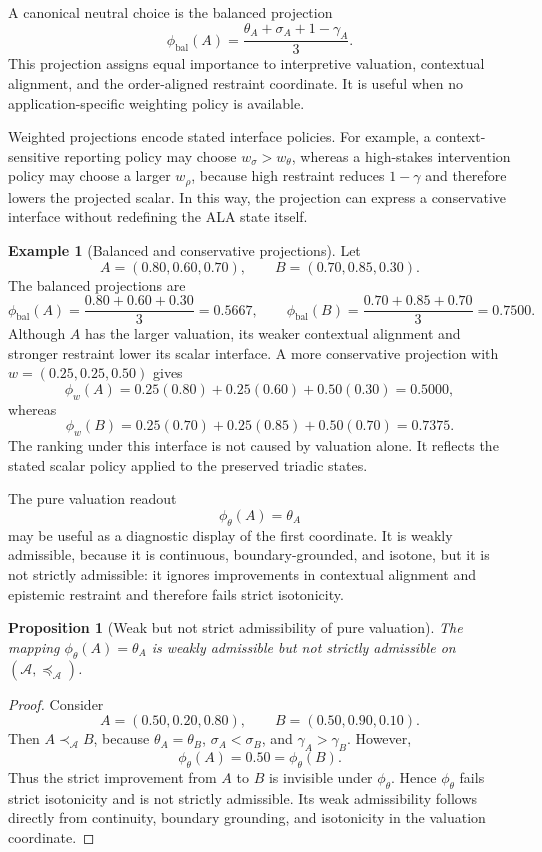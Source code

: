 \documentclass[reqno,final]{amsart}
\theoremstyle{definition}
\newtheorem{example}{Example}
\theoremstyle{plain}
\newtheorem{proposition}{Proposition}
\theoremstyle{remark}
\providecommand{\cA}{\mathcal{A}}
\providecommand{\preceqA}{\preceq_{\mathcal A}}
\providecommand{\precA}{\prec_{\mathcal A}}
\begin{document}
A canonical neutral choice is the balanced projection
\begin{equation}
\phi_{\mathrm{bal}}(A)
=\frac{\theta_A+\sigma_A+1-\gamma_A}{3}.
\label{eq:balanced-projection}
\end{equation}
This projection assigns equal importance to interpretive valuation, contextual alignment, and the order-aligned restraint coordinate. It is useful when no application-specific weighting policy is available.

Weighted projections encode stated interface policies. For example, a context-sensitive reporting policy may choose \(w_\sigma>w_\theta\), whereas a high-stakes intervention policy may choose a larger \(w_\rho\), because high restraint reduces \(1-\gamma\) and therefore lowers the projected scalar. In this way, the projection can express a conservative interface without redefining the ALA state itself.

\begin{example}[Balanced and conservative projections]
Let
\[
A=(0.80,0.60,0.70),
\qquad
B=(0.70,0.85,0.30).
\]
The balanced projections are
\[
\phi_{\mathrm{bal}}(A)=\frac{0.80+0.60+0.30}{3}=0.5667,
\qquad
\phi_{\mathrm{bal}}(B)=\frac{0.70+0.85+0.70}{3}=0.7500.
\]
Although \(A\) has the larger valuation, its weaker contextual alignment and stronger restraint lower its scalar interface. A more conservative projection with \(w=(0.25,0.25,0.50)\) gives
\[
\phi_w(A)=0.25(0.80)+0.25(0.60)+0.50(0.30)=0.5000,
\]
whereas
\[
\phi_w(B)=0.25(0.70)+0.25(0.85)+0.50(0.70)=0.7375.
\]
The ranking under this interface is not caused by valuation alone. It reflects the stated scalar policy applied to the preserved triadic states.
\end{example}

The pure valuation readout
\[
\phi_\theta(A)=\theta_A
\]
may be useful as a diagnostic display of the first coordinate. It is weakly admissible, because it is continuous, boundary-grounded, and isotone, but it is not strictly admissible: it ignores improvements in contextual alignment and epistemic restraint and therefore fails strict isotonicity.

\begin{proposition}[Weak but not strict admissibility of pure valuation]
The mapping \(\phi_\theta(A)=\theta_A\) is weakly admissible but not strictly admissible on \((\cA,\preceqA)\).
\end{proposition}

\begin{proof}
Consider
\[
A=(0.50,0.20,0.80),
\qquad
B=(0.50,0.90,0.10).
\]
Then \(A\precA B\), because \(\theta_A=\theta_B\), \(\sigma_A<\sigma_B\), and \(\gamma_A>\gamma_B\). However,
\[
\phi_\theta(A)=0.50=\phi_\theta(B).
\]
Thus the strict improvement from \(A\) to \(B\) is invisible under \(\phi_\theta\). Hence \(\phi_\theta\) fails strict isotonicity and is not strictly admissible. Its weak admissibility follows directly from continuity, boundary grounding, and isotonicity in the valuation coordinate.
\end{proof}
\end{document}
